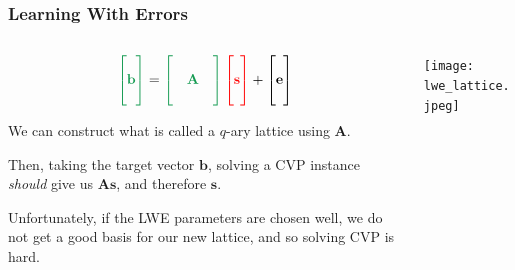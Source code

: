 \documentclass[
aspectratio=169, %
t, %
onlytextwidth, %
10pt, %
]{beamer}
\begin{document}
\begin{frame}
    \frametitle{Learning With Errors}
    \begin{columns}[T] %
        \begin{column}{0.48\linewidth} %
            \begin{tcolorbox}[colback=ICLBlue!5!white,colframe=ICLBlue,title=Learning With Errors Problem (LWE)]
                \[
                    \color{ForestGreen} \begin{bmatrix} \\ \mathbf{b} \\ \\ \end{bmatrix} \color{black} = \color{ForestGreen} \begin{bmatrix} & & \\ & \mathbf{A} & \\ & & \end{bmatrix} \color{red} \begin{bmatrix} \\  \mathbf{s} \\ \\ \end{bmatrix} \color{black} + \begin{bmatrix} \\ \mathbf{e} \\ \\ \end{bmatrix}
                \]
            \end{tcolorbox}

            We can construct what is called a $q$-ary lattice using $\mathbf{A}$.

            Then, taking the target vector $\mathbf{b}$, solving a CVP instance \textit{should} give us $\mathbf{As}$, and therefore $\mathbf{s}$.

            Unfortunately, if the LWE parameters are chosen well, we do not get a good basis for our new lattice, and so solving CVP is hard.
        \end{column}
        \begin{column}{0.48\linewidth} %
            \texttt{[image: lwe\_lattice.jpeg]} %
        \end{column}
    \end{columns}
\end{frame}
\end{document}
